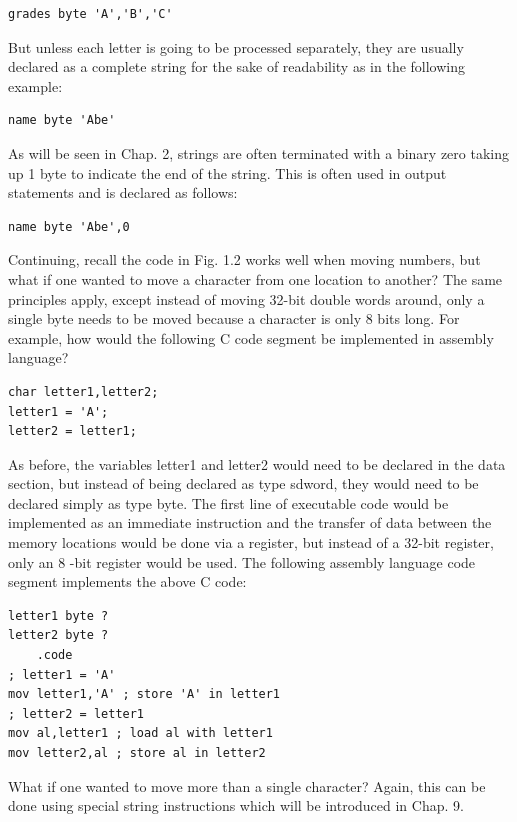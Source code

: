 \documentclass[10pt]{book}
\begin{document}
\begin{verbatim}
grades byte 'A','B','C'
\end{verbatim}

But unless each letter is going to be processed separately, they are usually declared as a complete string for the sake of readability as in the following example:

\begin{verbatim}
name byte 'Abe'
\end{verbatim}

As will be seen in Chap. 2, strings are often terminated with a binary zero taking up 1 byte to indicate the end of the string. This is often used in output statements and is declared as follows:

\begin{verbatim}
name byte 'Abe',0
\end{verbatim}

Continuing, recall the code in Fig. 1.2 works well when moving numbers, but what if one wanted to move a character from one location to another? The same principles apply, except instead of moving 32-bit double words around, only a single byte needs to be moved because a character is only 8 bits long. For example, how would the following C code segment be implemented in assembly language?

\begin{verbatim}
char letter1,letter2;
letter1 = 'A';
letter2 = letter1;
\end{verbatim}

As before, the variables letter1 and letter2 would need to be declared in the data section, but instead of being declared as type sdword, they would need to be declared simply as type byte. The first line of executable code would be implemented as an immediate instruction and the transfer of data between the memory locations would be done via a register, but instead of a 32-bit register, only an 8 -bit register would be used. The following assembly language code segment implements the above C code:

\begin{verbatim}
letter1 byte ?
letter2 byte ?
    .code
; letter1 = 'A'
mov letter1,'A' ; store 'A' in letter1
; letter2 = letter1
mov al,letter1 ; load al with letter1
mov letter2,al ; store al in letter2
\end{verbatim}

What if one wanted to move more than a single character? Again, this can be done using special string instructions which will be introduced in Chap. 9.
\end{document}
